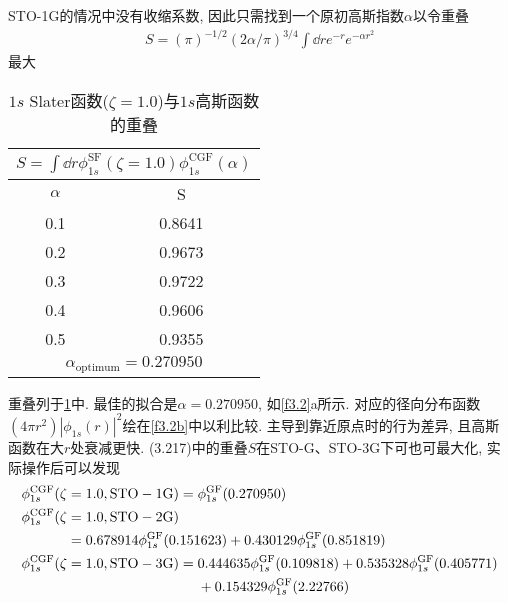STO-1G的情况中没有收缩系数, 因此只需找到一个原初高斯指数$\alpha$以令重叠
\begin{align}
S = (\pi)^{-1/2}(2\alpha/\pi)^{3/4}\int\dd{r}e^{-r}e^{-\alpha r^2}
\end{align}
最大
\begin{table}[H]
	\centering
	\caption{$1s$ Slater函数($\zeta=1.0$)与$1s$高斯函数的重叠}
	\begin{tabular}{cc}
		\multicolumn{2}{c}{$ S=\int\dd{r}\phi_{1s}^\mathrm{SF}(\zeta=1.0)\phi_{1s}^\mathrm{CGF}(\alpha)$}\\\hline
		$\alpha$ & S\\\hline
		0.1      & 0.8641\\
		0.2      & 0.9673\\
		0.3      & 0.9722\\
		0.4      & 0.9606\\
		0.5      & 0.9355\\\hline
		\multicolumn{2}{c}{$\alpha_\mathrm{optimum}=0.270950$}
	\end{tabular}
	\label{t3.1}
\end{table}
重叠列于\ref{t3.1}中. 最佳的拟合是$\alpha=0.270950$, 如\ref{f3.2}a所示. 对应的径向分布函数$(4\pi r^2)|\phi_{1s}(r)|^2$绘在\ref{f3.2b}中以利比较. 主导到靠近原点时的行为差异, 且高斯函数在大$r$处衰减更快. (3.217)中的重叠$S$在STO-G、STO-3G下可也可最大化, 实际操作后可以发现
\begin{alignat}{2}
\label{3.219}
\phi_{1s}^\mathrm{CGF}(\zeta&=1.0,\mathrm{STO-1G}) = \phi_{1s}^\mathrm{GF}(0.270950)\\
\phi_{1s}^\mathrm{CGF}(\zeta&=1.0,\mathrm{STO-2G})\notag\\
                            &=0.678914\phi_{1s}^\mathrm{GF}(0.151623) +0.430129\phi_{1s}^\mathrm{GF}(0.851819)\\
\phi_{1s}^\mathrm{CGF}(\zeta&=1.0,\mathrm{STO-3G})=
\begin{alignedat}[t]{1}&0.444635\phi_{1s}^\mathrm{GF}(0.109818) + 0.535328\phi_{1s}^\mathrm{GF}(0.405771)\\& + 0.154329\phi_{1s}^\mathrm{GF}(2.22766)\end{alignedat}
\end{alignat}

